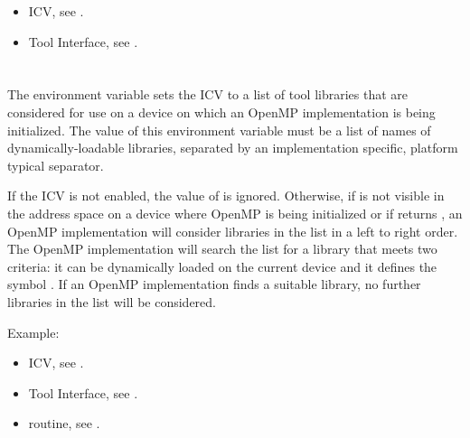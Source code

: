 \crossreferences
\begin{itemize}
\item {} ICV, see .

\item Tool Interface, see .
\end{itemize}



\section{}
\label{sec:OMP_TOOL_LIBRARIES}

The  environment variable sets the
 ICV to a list of tool libraries that are
considered for use on a device on which an OpenMP implementation
is being initialized. The value of this environment variable must 
be a list of names of dynamically-loadable libraries, separated 
by an implementation specific, platform typical separator.

If the  ICV is not enabled, the value of 
 is ignored. Otherwise, if  
is not visible in the address space on a device where OpenMP is being
initialized or if  returns , an OpenMP 
implementation will consider libraries in the  list
in a left to right order.  The OpenMP implementation will search the list for
a library that meets two criteria: it can be dynamically loaded on the 
current device and it defines the symbol . If an 
OpenMP implementation finds a suitable library, no further libraries in 
the list will be considered.

Example:
\begin{ompEnv}
\end{ompEnv}

\crossreferences
\begin{itemize}
\item {} ICV, see .

\item Tool Interface, see .

\item {} routine, see .
\end{itemize}



